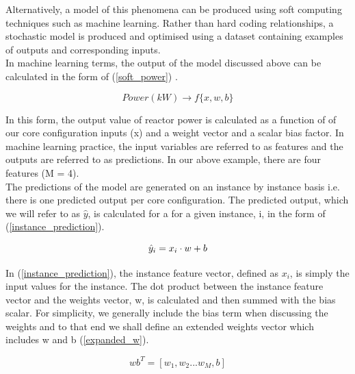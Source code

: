 


\noindent
Alternatively, a model of this phenomena can be produced using soft computing techniques \cite{ibrahim2016overview} such as machine learning. Rather than hard coding relationships, a stochastic model is produced and optimised using a dataset containing examples of outputs and corresponding inputs. \\

\noindent
In machine learning terms, the output of the model discussed above can be calculated in the form of (\ref{soft_power}) .

\begin{equation} \label{soft_power}
	Power(kW)  \rightarrow f\{x, w, b\}
\end{equation}

\noindent
In this form, the output value of reactor power is calculated as a function of of our core configuration inputs (x) and a weight vector and a scalar bias factor. In machine learning practice, the input variables are referred to as features and the outputs are referred to as predictions. In our above example, there are four features (M = 4). \\

\noindent
The predictions of the model are generated on an instance by instance basis i.e. there is one predicted output per core configuration. The predicted output, which we will refer to as $\hat{y}$, is calculated for a for a given instance, i, in the form of (\ref{instance_prediction}).

\begin{equation} \label{instance_prediction}
	\hat{y}_i = x_i \space \cdot \space w + b
\end{equation}

\noindent 
In (\ref{instance_prediction}), the instance feature vector, defined as $x_i$, is simply the input values for the instance. The dot product between the instance feature vector and the weights vector, w, is calculated and then summed with the bias scalar.  For simplicity, we generally include the bias term when discussing the weights and to that end we shall define an extended weights vector which includes w and b (\ref{expanded_w}).

\begin{equation} \label{expanded_w}
	wb^T = [w_1, w_2 ... w_M, b]
\end{equation}


